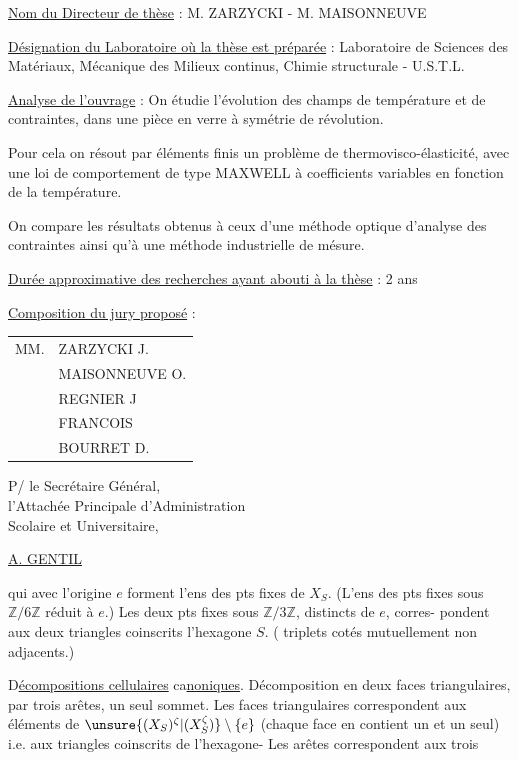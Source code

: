 \uline{Nom du Directeur de thèse} : M. ZARZYCKI - M. MAISONNEUVE

\uline{Désignation du Laboratoire où la thèse est préparée} : Laboratoire de Sciences des Matériaux, Mécanique des Milieux continus, Chimie structurale - U.S.T.L.

\uline{Analyse de l'ouvrage} : On étudie l'évolution des champs de température et de contraintes, dans une pièce en verre à symétrie de révolution.

Pour cela on résout par éléments finis un problème de thermovisco-élasticité, avec une loi de comportement de type MAXWELL à coefficients variables en fonction de la température.

On compare les résultats obtenus à ceux d'une méthode optique d'analyse des contraintes ainsi qu'à une méthode industrielle de mésure.

\uline{Durée approximative des recherches ayant abouti à la thèse} : 2 ans

\uline{Composition du jury proposé} : \begin{tabular}[t]{ll}
MM. & ZARZYCKI J.\\
& MAISONNEUVE O.\\
& REGNIER J\\
& FRANCOIS\\
& BOURRET D.
\end{tabular}

\begin{flushright}
P/ le Secrétaire Général,\\
l'Attachée Principale d'Administration\\
Scolaire et Universitaire,


\uline{A. GENTIL}
\end{flushright}



qui avec l'origine $e$ forment l'ens
des pts fixes de $X_S$. (L'ens
des pts fixes sous $\mathbb Z/6\mathbb Z$  réduit
à $e$.) Les deux pts fixes
sous $\mathbb Z/3\mathbb Z$, distincts de $e$, corres-\newline
pondent aux deux triangles coinscrits
 l'hexagone $S$. ( triplets 
cotés mutuellement non adjacents.)

D\uline{écompositions cellulaires}\newline
ca\uline{noniques}. Décomposition en
deux faces triangulaires, par trois
arêtes, un seul sommet. Les
faces triangulaires correspondent aux
éléments de $\unsure{(X_S)^\zeta|(X_S^\zeta)}\setminus\{e\}$ (chaque
face en contient un et un seul) i.e.
aux triangles coinscrits de l'hexagone-\newline
Les arêtes correspondent aux trois

